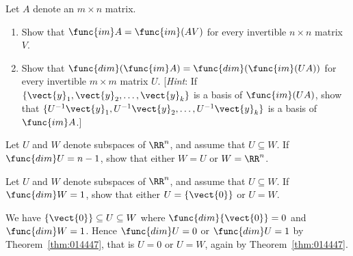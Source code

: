 \begin{multicols}{2}
\begin{ex}
\begin{sol}
\begin{enumerate}[label={\alph*.}]
\end{enumerate}
\end{sol}
\end{ex}

\begin{ex}
Let $A$ denote an $m \times n$ matrix.

\begin{enumerate}[label={\alph*.}]
\item Show that $\func{im} A = \func{im}(AV)$ for every invertible $n \times n$ matrix $V$.

\item Show that $\func{dim}(\func{im} A) = \func{dim}(\func{im}(UA))$ for every invertible $m \times m$ matrix $U$. [\textit{Hint}: If $\{\vect{y}_{1}, \vect{y}_{2}, \dots, \vect{y}_{k}\}$ is a basis of $\func{im}(UA)$, show that $\{U^{-1}\vect{y}_{1}, U^{-1}\vect{y}_{2}, \dots, U^{-1}\vect{y}_{k}\}$ is a basis of $\func{im} A$.]

\end{enumerate}
\end{ex}

\begin{ex}
Let $U$ and $W$ denote subspaces of $\RR^n$, and assume that $U \subseteq W$. If $\func{dim} U = n - 1$, show that either $W = U$ or $W = \RR^n$.
\end{ex}

\begin{ex}
Let $U$ and $W$ denote subspaces of $\RR^n$, and assume that $U \subseteq W$. If $\func{dim} W = 1$, show that either $U = \{\vect{0}\}$ or $U = W$.

\begin{sol}
We have $\{\vect{0}\} \subseteq U \subseteq W$ where $\func{dim}\{\vect{0}\} = 0$ and $\func{dim} W = 1$. Hence $\func{dim} U = 0$ or $\func{dim} U = 1$ by Theorem~\ref{thm:014447}, that is $U = 0$ or $U = W$, again by Theorem~\ref{thm:014447}.
\end{sol}
\end{ex}
\end{multicols}
